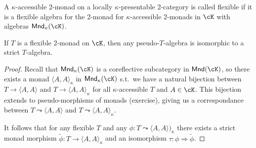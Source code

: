 \documentclass[a4paper,11pt,oneside,openany]{scrbook}
\begin{document}
\begin{defn}
    A $\kappa$-accessible 2-monad on a locally $\kappa$-presentable 2-category
    is called flexible if it is a flexible algebra for the 2-monad for
    $\kappa$-accessible 2-monads in $\cK$ with algebras $\Mnd_\kappa(\cK)$.
\end{defn}

\begin{prop}
    If $T$ is a flexible 2-monad on $\cK$, then any pseudo-$T$-algebra is
    isomorphic to a strict $T$-algebra.
\end{prop}
\begin{proof}
    Recall that $\Mnd_\kappa(\cK)$ is a coreflective subcategory in
    $\Mnd(\cK)$, so there exists a monad $\langle A,A\rangle_\kappa$ in
    $\Mnd_\kappa(\cK)$ s.t.\ we have a natural bijection between
    $T\rightarrow\langle A,A\rangle$ and $T\rightarrow\langle A,A\rangle_\kappa$
    for all $\kappa$-accessible $T$ and $A\in\cK$. This bijection extends to
    pseudo-morphisms of monads (exercise), giving us a correspondance between
    $T\leadsto\langle A,A\rangle$ and $T\leadsto\langle A,A\rangle_\kappa$.

    It follows that for any flexible $T$ and any $\phi\colon T\leadsto\langle
    A,A\rangle)_\kappa$ there exists a strict monad morphism $\tilde{\phi}\colon
    T\rightarrow\langle A,A\rangle_\kappa$ and an isomorphism
    $\tau\colon\phi\Rightarrow\tilde{\phi}$.


\end{proof}
\end{document}
